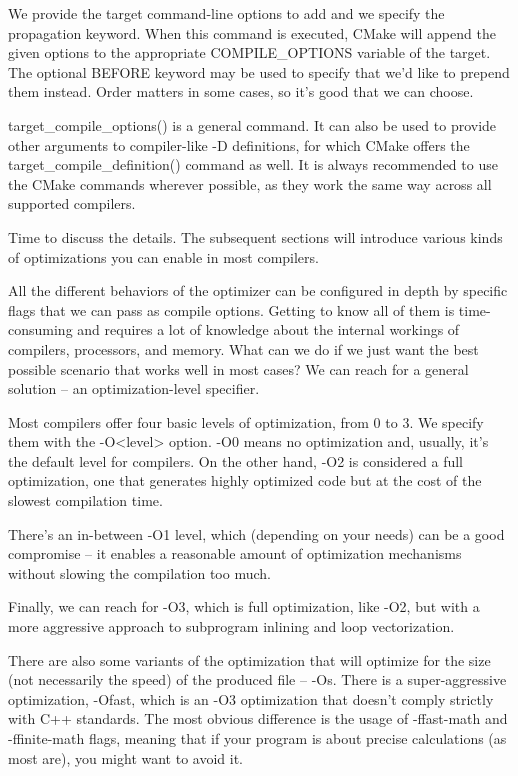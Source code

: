 We provide the target command-line options to add and we specify the propagation keyword. When this command is executed, CMake will append the given options to the appropriate COMPILE\_OPTIONS variable of the target. The optional BEFORE keyword may be used to specify that we'd like to prepend them instead. Order matters in some cases, so it's good that we can choose.

\begin{tcolorbox}[colback=blue!5!white,colframe=blue!75!black,title=Important Note]
target\_compile\_options() is a general command. It can also be used to provide other arguments to compiler-like -D definitions, for which CMake offers the target\_compile\_definition() command as well. It is always recommended to use the CMake commands wherever possible, as they work the same way across all supported compilers.
\end{tcolorbox}

Time to discuss the details. The subsequent sections will introduce various kinds of optimizations you can enable in most compilers.


All the different behaviors of the optimizer can be configured in depth by specific flags that we can pass as compile options. Getting to know all of them is time-consuming and requires a lot of knowledge about the internal workings of compilers, processors, and memory. What can we do if we just want the best possible scenario that works well in most cases? We can reach for a general solution – an optimization-level specifier.

Most compilers offer four basic levels of optimization, from 0 to 3. We specify them with the -O<level> option. -O0 means no optimization and, usually, it's the default level for compilers. On the other hand, -O2 is considered a full optimization, one that generates highly optimized code but at the cost of the slowest compilation time.

There's an in-between -O1 level, which (depending on your needs) can be a good compromise – it enables a reasonable amount of optimization mechanisms without slowing the compilation too much.

Finally, we can reach for -O3, which is full optimization, like -O2, but with a more aggressive approach to subprogram inlining and loop vectorization.

There are also some variants of the optimization that will optimize for the size (not necessarily the speed) of the produced file – -Os. There is a super-aggressive optimization, -Ofast, which is an -O3 optimization that doesn't comply strictly with C++ standards.
The most obvious difference is the usage of -ffast-math and -ffinite-math flags, meaning that if your program is about precise calculations (as most are), you might want to avoid it.

